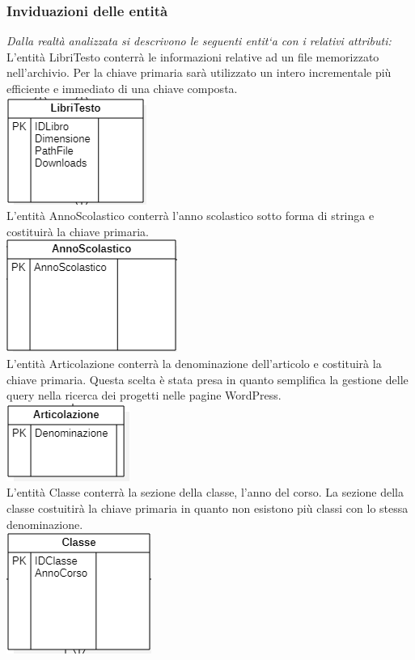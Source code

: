\documentclass{article}
\begin{document}
	\subsubsection{\textbf{Inviduazioni delle entità}}
	\textit{Dalla realtà analizzata si descrivono le seguenti entit`a con i relativi attributi:}
    L'entità LibriTesto conterrà le informazioni relative ad un file memorizzato nell'archivio. Per la chiave primaria sarà utilizzato un intero incrementale più efficiente e immediato di una chiave composta. \\
	\includegraphics[scale=0.5]{libro.png}\\
    L'entità AnnoScolastico conterrà l'anno scolastico sotto forma di stringa e costituirà la chiave primaria. \\
	\includegraphics[scale=0.5]{annoscolastico.png}\\
    L'entità Articolazione conterrà la denominazione dell'articolo e costituirà la chiave primaria. Questa scelta è stata presa in quanto semplifica la gestione delle query nella ricerca dei progetti nelle pagine WordPress.\\  
	\includegraphics[scale=0.5]{articolazione.png}\\
    L'entità Classe conterrà la sezione della classe, l'anno del corso. La sezione della classe costuitirà la chiave primaria in quanto non esistono più classi con lo stessa denominazione. \\
	\includegraphics[scale=0.5]{classe.png}\\
\end{document}
